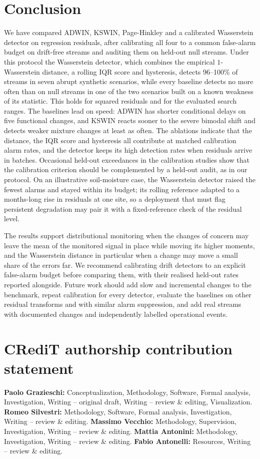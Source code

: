 \documentclass[preprint,12pt]{elsarticle}
\begin{document}
\section{Conclusion}
\label{sec:conclusions}
We have compared ADWIN, KSWIN, Page-Hinkley and a calibrated Wasserstein detector on regression residuals, after calibrating all four to a common false-alarm budget on drift-free streams and auditing them on held-out null streams. Under this protocol the Wasserstein detector, which combines the empirical $1$-Wasserstein distance, a rolling IQR score and hysteresis, detects 96--100\% of streams in seven abrupt synthetic scenarios, while every baseline detects no more often than on null streams in one of the two scenarios built on a known weakness of its statistic. This holds for squared residuals and for the evaluated search ranges. The baselines lead on speed: ADWIN has shorter conditional delays on five functional changes, and KSWIN reacts sooner to the severe bimodal shift and detects weaker mixture changes at least as often. The ablations indicate that the distance, the IQR score and hysteresis all contribute at matched calibration alarm rates, and the detector keeps its high detection rates when residuals arrive in batches. Occasional held-out exceedances in the calibration studies show that the calibration criterion should be complemented by a held-out audit, as in our protocol. On an illustrative soil-moisture case, the Wasserstein detector raised the fewest alarms and stayed within its budget; its rolling reference adapted to a months-long rise in residuals at one site, so a deployment that must flag persistent degradation may pair it with a fixed-reference check of the residual level.

The results support distributional monitoring when the changes of concern may leave the mean of the monitored signal in place while moving its higher moments, and the Wasserstein distance in particular when a change may move a small share of the errors far. We recommend calibrating drift detectors to an explicit false-alarm budget before comparing them, with their realised held-out rates reported alongside. Future work should add slow and incremental changes to the benchmark, repeat calibration for every detector, evaluate the baselines on other residual transforms and with similar alarm suppression, and add real streams with documented changes and independently labelled operational events.

\section*{CRediT authorship contribution statement}
\textbf{Paolo Grazieschi:} Conceptualization, Methodology, Software, Formal analysis, Investigation, Writing -- original draft, Writing -- review \& editing, Visualization. \textbf{Romeo Silvestri:} Methodology, Software, Formal analysis, Investigation, Writing -- review \& editing.
\textbf{Massimo Vecchio:} Methodology, Supervision, Investigation, Writing -- review \& editing.
\textbf{Mattia Antonini:} Methodology, Investigation, Writing -- review \& editing.
\textbf{Fabio Antonelli:} Resources, Writing -- review \& editing.
\end{document}
